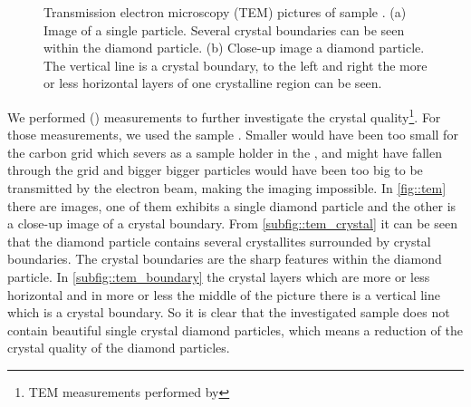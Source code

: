 \begin{figure}[tp]
\begin{subfigure}[t]{ 0.49\linewidth}
				\label{subfig::tem_boundary}
			\end{subfigure}
			\caption{Transmission electron microscopy (TEM) pictures of sample \insituH. (a) Image of a single \nd particle. Several crystal boundaries can be seen within the diamond particle. (b) Close-up image a diamond particle. The vertical line is a crystal boundary, to the left and right the more or less horizontal layers of one crystalline region can be seen.}
			\label{fig::tem}
		\end{figure}


		We performed \tem (\TEM) measurements to further investigate the crystal quality\footnote{TEM measurements performed by \schmauch}.
		For those \TEM measurements, we used the sample \insituH.
		Smaller \nds would have been too small for the carbon grid which severs as a sample holder in the \TEM, and might have fallen through the grid and bigger bigger particles would have been too big to be transmitted by the electron beam, making the imaging impossible.
		In \autoref{fig::tem} there are \TEM images, one of them exhibits a single diamond particle and the other is a close-up image of a crystal boundary. 
		From \autoref{subfig::tem_crystal} it can be seen that the diamond particle contains several crystallites surrounded by crystal boundaries. 
		The crystal boundaries are the sharp features within the diamond particle.
		In \autoref{subfig::tem_boundary} the crystal layers which are more or less horizontal and in more or less the middle of the picture there is a vertical line which is a crystal boundary.
		So it is clear that the investigated sample does not contain beautiful single crystal diamond particles, which means a reduction of the crystal quality of the diamond particles.


